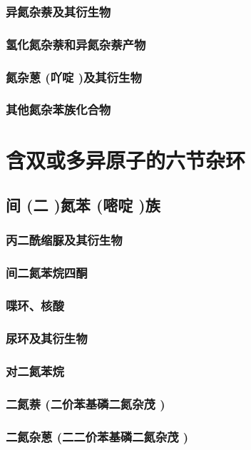 \documentclass[UTF8]{../03-Chemistry}
\begin{document}
        \subsubsection{异氮杂萘及其衍生物}
        \subsubsection{氢化氮杂萘和异氮杂萘产物}
        \subsubsection{氮杂蒽 (吖啶 )及其衍生物}
        \subsubsection{其他氮杂苯族化合物}
\section{含双或多异原子的六节杂环}
    \subsection{间 (二 )氮苯 (嘧啶 )族}
        \subsubsection{丙二酰缩脲及其衍生物}
        \subsubsection{间二氮苯烷四酮}
        \subsubsection{喋环、核酸}
        \subsubsection{尿环及其衍生物}
        \subsubsection{对二氮苯烷}
        \subsubsection{二氮萘 (二价苯基磷二氮杂茂 )}
        \subsubsection{二氮杂蒽 (二二价苯基磷二氮杂茂 )}
\end{document}
